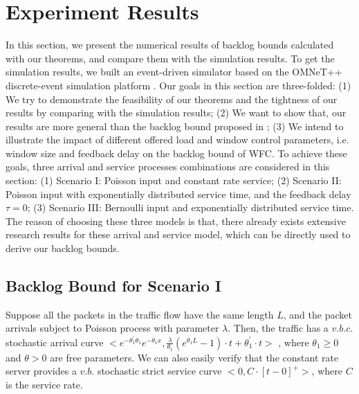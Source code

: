 \documentclass[paper]{ieice}
\begin{document}
\section{Experiment Results}\label{experiments}
In this section, we present the numerical results of backlog bounds calculated with our theorems, and compare them with the simulation results. To get the simulation results, we built an event-driven simulator based on the OMNeT++ discrete-event simulation platform \cite{omnetpp}. Our goals in this section are three-folded: (1) We try to demonstrate the feasibility of our theorems and the tightness of our results by comparing with the simulation results; (2) We want to show that, our results are more general than the backlog bound proposed in \cite{jung1996analysis}; (3) We intend to illustrate the impact of different offered load and window control parameters, i.e. window size and feedback delay on the backlog bound of WFC. To achieve these goals, three arrival and service processes combinations are considered in this section: (1) Scenario I: Poisson input and constant rate service; (2) Scenario II: Poisson input with exponentially distributed service time, and the feedback delay $\tau=0$; (3) Scenario III: Bernoulli input and exponentially distributed service time. The reason of choosing these three models is that, there already exists extensive research results for these arrival and service model, which can be directly used to derive our backlog bounds.

\subsection{Backlog Bound for Scenario I}
Suppose all the packets in the traffic flow have the same length $L$, and the packet arrivals subject to Poisson process with parameter $\lambda$. Then, the traffic has a $v.b.c.$ stochastic arrival curve $<e^{-\theta_1^\prime\theta_1}e^{-\theta_1 x},\frac{\lambda}{\theta_1}(e^{\theta_1 L}-1)\cdot t+\theta_1^\prime\cdot t>$ \cite{jiang2010note}, where $\theta_1\geq 0$ and $\theta>0$ are free parameters. We can also easily verify that the constant rate server provides a $v.b.$ stochastic strict service curve $<0,C\cdot [t-0]^+>$, where $C$ is the service rate.
\end{document}

